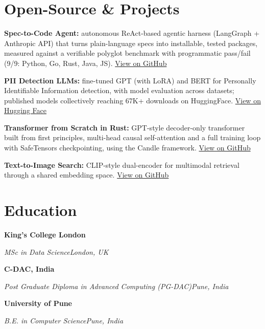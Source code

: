 \documentclass[10pt,a4paper]{article}
\newcommand{\entry}[4]{%
  {\color{company}\bfseries #1}\hfill {\color{muted}#2}\par
  \vspace{1pt}
  {\itshape #3}\hfill {\color{muted}\itshape #4}\par
  \vspace{3pt}%
}
\begin{document}
\section{Open-Source \& Projects}
\begin{tight}
  \item \textbf{Spec-to-Code Agent:} autonomous ReAct-based agentic harness (LangGraph + Anthropic API) that turns plain-language specs into installable, tested packages, measured against a verifiable polyglot benchmark with programmatic pass/fail (9/9: Python, Go, Rust, Java, JS). \href{https://github.com/abhijeetscode/Spec-to-Code-Agent}{View on GitHub}
  \item \textbf{PII Detection LLMs:} fine-tuned GPT (with LoRA) and BERT for Personally Identifiable Information detection, with model evaluation across datasets; published models collectively reaching 67K+ downloads on HuggingFace. \href{https://huggingface.co/ab-ai/pii_model}{View on Hugging Face}
  \item \textbf{Transformer from Scratch in Rust:} GPT-style decoder-only transformer built from first principles, multi-head causal self-attention and a full training loop with SafeTensors checkpointing, using the Candle framework. \href{https://github.com/abhijeetscode/transformer-rust}{View on GitHub}
  \item \textbf{Text-to-Image Search:} CLIP-style dual-encoder for multimodal retrieval through a shared embedding space. \href{https://github.com/abhijeetscode/text-to-image-search}{View on GitHub}
\end{tight}

\section{Education}
\entry{King's College London}{}{MSc in Data Science}{London, UK}
\vspace{-3pt}
\entry{C-DAC, India}{}{Post Graduate Diploma in Advanced Computing (PG-DAC)}{Pune, India}
\vspace{-3pt}
\entry{University of Pune}{}{B.E. in Computer Science}{Pune, India}
\end{document}
